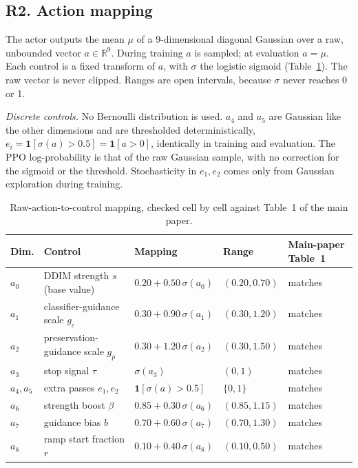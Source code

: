 \subsection*{R2. Action mapping}
\label{sec:repro-action}

The actor outputs the mean $\mu$ of a 9-dimensional diagonal Gaussian over a raw, unbounded vector $a \in \mathbb{R}^9$. During training $a$ is sampled; at evaluation $a = \mu$. Each control is a fixed transform of $a$, with $\sigma$ the logistic sigmoid (Table~\ref{tab:repro-action}). The raw vector is never clipped. Ranges are open intervals, because $\sigma$ never reaches 0 or 1.

\emph{Discrete controls.} No Bernoulli distribution is used. $a_4$ and $a_5$ are Gaussian like the other dimensions and are thresholded deterministically, $e_i = \mathbf{1}[\sigma(a) > 0.5] = \mathbf{1}[a > 0]$, identically in training and evaluation. The PPO log-probability is that of the raw Gaussian sample, with no correction for the sigmoid or the threshold. Stochasticity in $e_1, e_2$ comes only from Gaussian exploration during training.

\begin{table}[t]
\centering
\caption{Raw-action-to-control mapping, checked cell by cell against Table~1 of the main paper.}
\label{tab:repro-action}
\small
\begin{tabular}{@{}l l l l l@{}}
\toprule
Dim. & Control & Mapping & Range & Main-paper Table~1 \\
\midrule
$a_0$ & DDIM strength $s$ (base value) & $0.20 + 0.50\,\sigma(a_0)$ & $(0.20, 0.70)$ & matches \\
$a_1$ & classifier-guidance scale $g_c$ & $0.30 + 0.90\,\sigma(a_1)$ & $(0.30, 1.20)$ & matches \\
$a_2$ & preservation-guidance scale $g_p$ & $0.30 + 1.20\,\sigma(a_2)$ & $(0.30, 1.50)$ & matches \\
$a_3$ & stop signal $\tau$ & $\sigma(a_3)$ & $(0, 1)$ & matches \\
$a_4, a_5$ & extra passes $e_1, e_2$ & $\mathbf{1}[\sigma(a) > 0.5]$ & $\{0, 1\}$ & matches \\
$a_6$ & strength boost $\beta$ & $0.85 + 0.30\,\sigma(a_6)$ & $(0.85, 1.15)$ & matches \\
$a_7$ & guidance bias $b$ & $0.70 + 0.60\,\sigma(a_7)$ & $(0.70, 1.30)$ & matches \\
$a_8$ & ramp start fraction $r$ & $0.10 + 0.40\,\sigma(a_8)$ & $(0.10, 0.50)$ & matches \\
\bottomrule
\end{tabular}
\end{table}

